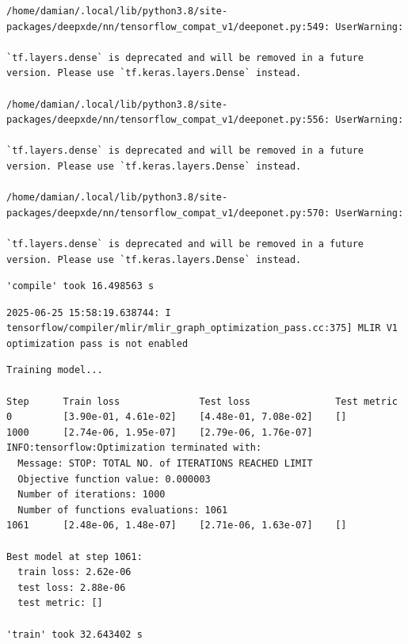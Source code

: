 \documentclass[
  spanish,
  us-letterpaper,
  DIV=11,
  numbers=noendperiod]{scrreprt}
\theoremstyle{definition}
\theoremstyle{plain}
\theoremstyle{remark}
\begin{document}
\begin{verbatim}
/home/damian/.local/lib/python3.8/site-packages/deepxde/nn/tensorflow_compat_v1/deeponet.py:549: UserWarning:

`tf.layers.dense` is deprecated and will be removed in a future version. Please use `tf.keras.layers.Dense` instead.

/home/damian/.local/lib/python3.8/site-packages/deepxde/nn/tensorflow_compat_v1/deeponet.py:556: UserWarning:

`tf.layers.dense` is deprecated and will be removed in a future version. Please use `tf.keras.layers.Dense` instead.

/home/damian/.local/lib/python3.8/site-packages/deepxde/nn/tensorflow_compat_v1/deeponet.py:570: UserWarning:

`tf.layers.dense` is deprecated and will be removed in a future version. Please use `tf.keras.layers.Dense` instead.
\end{verbatim}

\begin{verbatim}
'compile' took 16.498563 s
\end{verbatim}

\begin{verbatim}
2025-06-25 15:58:19.638744: I tensorflow/compiler/mlir/mlir_graph_optimization_pass.cc:375] MLIR V1 optimization pass is not enabled
\end{verbatim}

\begin{verbatim}
Training model...

Step      Train loss              Test loss               Test metric
0         [3.90e-01, 4.61e-02]    [4.48e-01, 7.08e-02]    []  
1000      [2.74e-06, 1.95e-07]    [2.79e-06, 1.76e-07]        
INFO:tensorflow:Optimization terminated with:
  Message: STOP: TOTAL NO. of ITERATIONS REACHED LIMIT
  Objective function value: 0.000003
  Number of iterations: 1000
  Number of functions evaluations: 1061
1061      [2.48e-06, 1.48e-07]    [2.71e-06, 1.63e-07]    []  

Best model at step 1061:
  train loss: 2.62e-06
  test loss: 2.88e-06
  test metric: []

'train' took 32.643402 s
\end{verbatim}
\end{document}
